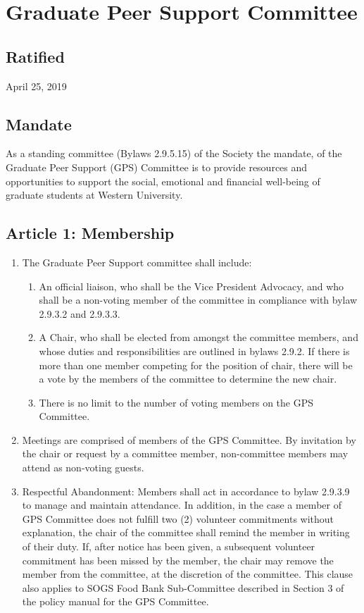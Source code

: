 \section{Graduate Peer Support Committee}

\subsection{Ratified}
April 25, 2019

\subsection{Mandate}
As a standing committee (Bylaws 2.9.5.15) of the Society the mandate, of the Graduate Peer Support (GPS) Committee is to provide resources and opportunities to support the social, emotional and financial well-being of graduate students at Western University.

\subsection{Article 1: Membership}
\begin{enumerate}[label*=\arabic*., align=left]	
\item The Graduate Peer Support committee shall include:
\begin{enumerate}[label*=\arabic*., align=left]	
\item An official liaison, who shall be the Vice President Advocacy, and who shall be a non-voting member of the committee in compliance with bylaw 2.9.3.2 and 2.9.3.3.
\item A Chair, who shall be elected from amongst the committee members, and whose duties and responsibilities are outlined in bylaws 2.9.2. If there is more than one member competing for the position of chair, there will be a vote by the members of the committee to determine the new chair.
\item There is no limit to the number of voting members on the GPS Committee.
\end{enumerate}
\item Meetings are comprised of members of the GPS Committee. By invitation by the chair or request by a committee member, non-committee members may attend as non-voting guests.
\item Respectful Abandonment: Members shall act in accordance to bylaw 2.9.3.9 to manage and maintain attendance. In addition, in the case a member of GPS Committee does not fulfill two (2) volunteer commitments without explanation, the chair of the committee shall remind the member in writing of their duty. If, after notice has been given, a subsequent volunteer commitment has been missed by the member, the chair may remove the member from the committee, at the discretion of the committee. This clause also applies to SOGS Food Bank Sub-Committee described in Section 3 of the policy manual for the GPS Committee.
\end{enumerate}

